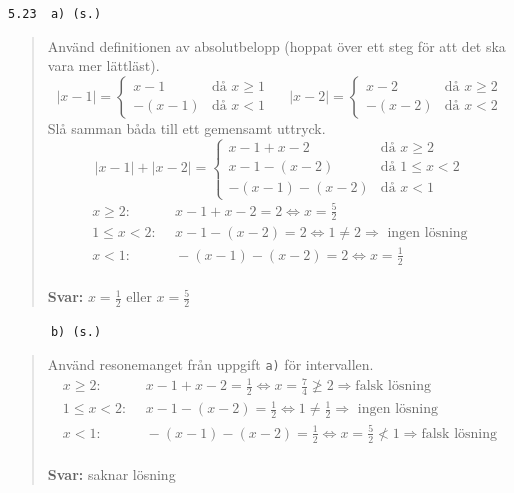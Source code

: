 \documentclass[a4paper]{article}
\newcommand{\tskcol}[1]{\textcolor{tskcol}{#1}}
\begin{document}
	\texttt{\tskcol{5.23~~a) (s.)}}
	\begin{quotation}
		\noindent
		Använd definitionen av absolutbelopp (hoppat över ett steg för att det ska vara mer lättläst).
		\[|x-1|=
		\begin{cases}
		x-1&    \text{då } x \ge 1\\
		-(x-1)& \text{då } x < 1
		\end{cases}~~~~~~
		|x-2|=
		\begin{cases}
		x-2&    \text{då } x \ge 2\\
		-(x-2)& \text{då } x < 2
		\end{cases}\]
		Slå samman båda till ett gemensamt uttryck.
		\[|x-1|+|x-2|=
		\begin{cases}
		x-1+x-2&    \text{då } x \ge 2\\
		x-1-(x-2)& \text{då } 1 \le x < 2 \\
		-(x-1)-(x-2)& \text{då } x < 1 
		\end{cases}\]
		\begin{align*}
		    x \ge 2:&~~      x-1+x-2 = 2 \Leftrightarrow x = \frac{5}{2}\\
		1 \le x < 2:&~~    x-1-(x-2) = 2 \Leftrightarrow 1 \neq 2 \Rightarrow \text{ ingen lösning}\\
		      x < 1:&~~ -(x-1)-(x-2) = 2 \Leftrightarrow x = \frac{1}{2}
		\end{align*}
		\\
		\textbf{Svar:} $x = \frac{1}{2}$ eller $x = \frac{5}{2}$
	\end{quotation}
	
	\pagebreak
	\texttt{\tskcol{~~~~~~b) (s.)}}
	\begin{quotation}
		\noindent
		Använd resonemanget från uppgift \texttt{\tskcol{a)}} för intervallen.
		\begin{align*}
		    x \ge 2:&~~      x-1+x-2 = \frac{1}{2} \Leftrightarrow x = \frac{7}{4} \not\ge 2  \Rightarrow\text{falsk lösning}\\
		1 \le x < 2:&~~    x-1-(x-2) = \frac{1}{2} \Leftrightarrow 1 \neq \frac{1}{2} \Rightarrow \text{ ingen lösning}\\
		      x < 1:&~~ -(x-1)-(x-2) = \frac{1}{2} \Leftrightarrow x = \frac{5}{2} \not< 1  \Rightarrow\text{falsk lösning}
		\end{align*}
		\\
		\textbf{Svar:} saknar lösning
	\end{quotation}
	
\end{document}
